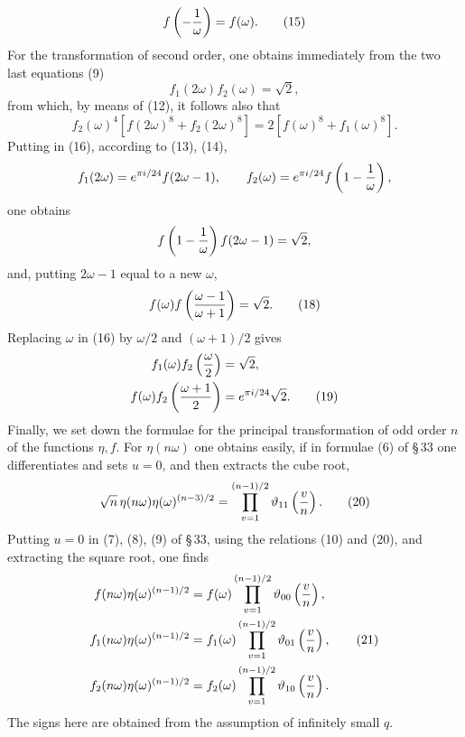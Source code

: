 \documentclass[11pt]{article}
\providecommand{\tht}{\vartheta}
\begin{document}
\begin{equation}
f\left(-{1\over\omega}\right)=f(\omega). \tag{15}
\end{equation}
For the transformation of second order, one obtains immediately from the two last equations (9)
\begin{equation}
f_1(2\omega)f_2(\omega)=\sqrt2, \tag{16}
\end{equation}
from which, by means of (12), it follows also that
\begin{equation}
f_2(\omega)^4[f(2\omega)^8+f_2(2\omega)^8]=2[f(\omega)^8+f_1(\omega)^8]. \tag{17}
\end{equation}
Putting in (16), according to (13), (14),
\[
f_1(2\omega)=e^{\pi i/24}f(2\omega-1),
\qquad
f_2(\omega)=e^{\pi i/24}f\left(1-{1\over\omega}\right),
\]
one obtains
\[
f\left(1-{1\over\omega}\right)f(2\omega-1)=\sqrt2,
\]
and, putting $2\omega-1$ equal to a new $\omega$,
\begin{equation}
f(\omega)f\left({\omega-1\over\omega+1}\right)=\sqrt2. \tag{18}
\end{equation}
Replacing $\omega$ in (16) by $\omega/2$ and $(\omega+1)/2$ gives
\begin{align}
f_1(\omega)f_2\left({\omega\over2}\right)&=\sqrt2,\notag\\
f(\omega)f_2\left({\omega+1\over2}\right)&=e^{\pi i/24}\sqrt2. \tag{19}
\end{align}
Finally, we set down the formulae for the principal transformation of odd order $n$ of the functions $\eta,f$. For $\eta(n\omega)$ one obtains easily, if in formulae (6) of \S\,33 one differentiates and sets $u=0$, and then extracts the cube root,
\begin{equation}
\sqrt n\,\eta(n\omega)\eta(\omega)^{(n-3)/2}
=\prod_{v=1}^{(n-1)/2}\tht_{11}\left({v\over n}\right). \tag{20}
\end{equation}
Putting $u=0$ in (7), (8), (9) of \S\,33, using the relations (10) and (20), and extracting the square root, one finds
\begin{align}
f(n\omega)\eta(\omega)^{(n-1)/2}&=f(\omega)\prod_{v=1}^{(n-1)/2}\tht_{00}\left({v\over n}\right),\notag\\
f_1(n\omega)\eta(\omega)^{(n-1)/2}&=f_1(\omega)\prod_{v=1}^{(n-1)/2}\tht_{01}\left({v\over n}\right), \tag{21}\\
f_2(n\omega)\eta(\omega)^{(n-1)/2}&=f_2(\omega)\prod_{v=1}^{(n-1)/2}\tht_{10}\left({v\over n}\right).\notag
\end{align}
The signs here are obtained from the assumption of infinitely small $q$.
\end{document}
